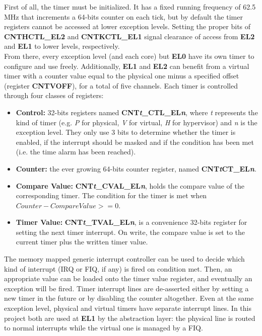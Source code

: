 \documentclass[12pt,a4paper,openright,twoside]{report}
\begin{document}
First of all, the timer must be initialized. It has a fixed running frequency
of 62.5 MHz that increments a 64-bits counter on each tick, but by default the 
timer registers cannot be accessed at lower 
exception levels. Setting the proper bits of \textbf{CNTHCTL\_EL2} 
and \textbf{CNTKCTL\_EL1} signal clearance of access from \textbf{EL2} 
and \textbf{EL1} to lower levels, respectively.\\

From there, every exception level (and each core) but \textbf{EL0} have its own timer to configure
and use freely. Additionally, \textbf{EL1} and \textbf{EL2} can benefit from a
virtual timer with a counter value equal to the physical one minus a 
specified offset (register \textbf{CNTVOFF}), for a total of five channels.
Each timer is controlled through four classes of registers:
\begin{itemize}
    \item \textbf{Control:} 32-bits registers named 
        \textbf{CNT\textit{t}\_CTL\_EL\textit{n}}, where \textit{t} represents the
        kind of timer (e.g. \textit{P} for physical, \textit{V} for virtual, 
        \textit{H} for hypervisor) and
        \textit{n} is the exception level. They only use 3 bits to determine whether
        the timer is enabled, if the interrupt should be masked and if the condition
        has been met (i.e. the time alarm has been reached).
    \item \textbf{Counter:} the ever growing 64-bits counter register, 
        named \textbf{CNT\textit{t}CT\_EL\textit{n}}.
    \item \textbf{Compare Value:} \textbf{CNT\textit{t}\_CVAL\_EL\textit{n}}, holds
        the compare value of the corresponding timer. The condition for the timer
        is met when $Counter - CompareValue >= 0$.
    \item \textbf{Timer Value:} \textbf{CNT\textit{t}\_TVAL\_EL\textit{n}}, is a
        convenience 32-bits register for setting the next timer interrupt. On write,
        the compare value is set to the current timer plus the written timer value.
\end{itemize}

The memory mapped generic interrupt controller can be used to decide which kind 
of interrupt (IRQ or FIQ, if any) is fired on condition met. Then, an appropriate
value can be loaded onto the timer value register, and eventually an exception will
be fired. Timer interrupt lines are de-asserted either by setting a new timer
in the future or by disabling the counter altogether.
Even at the same exception level, physical and virtual timers have separate interrupt 
lines. In this project both are used at \textbf{EL1} by the abstraction layer: 
the physical line is routed to normal interrupts while the virtual one is managed
by a FIQ.
\end{document}
